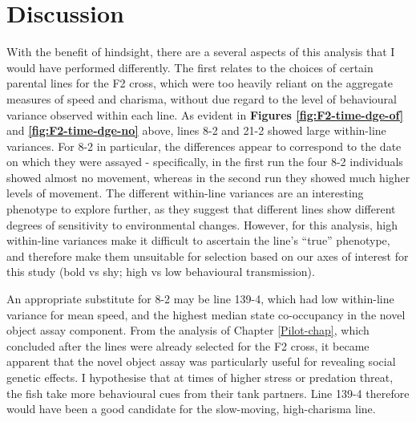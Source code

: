 \documentclass[
]{book}
\begin{document}
\hypertarget{discussion-1}{%
\section{Discussion}\label{discussion-1}}

With the benefit of hindsight, there are a several aspects of this analysis that I would have performed differently. The first relates to the choices of certain parental lines for the F2 cross, which were too heavily reliant on the aggregate measures of speed and charisma, without due regard to the level of behavioural variance observed within each line. As evident in \textbf{Figures \ref{fig:F2-time-dge-of}} and \textbf{\ref{fig:F2-time-dge-no}} above, lines \textcolor{8-2_FF699C}{8-2} and \textcolor{21-2_49B500}{21-2} showed large within-line variances. For \textcolor{8-2_FF699C}{8-2} in particular, the differences appear to correspond to the date on which they were assayed - specifically, in the first run the four \textcolor{8-2_FF699C}{8-2} individuals showed almost no movement, whereas in the second run they showed much higher levels of movement. The different within-line variances are an interesting phenotype to explore further, as they suggest that different lines show different degrees of sensitivity to environmental changes. However, for this analysis, high within-line variances make it difficult to ascertain the line's ``true'' phenotype, and therefore make them unsuitable for selection based on our axes of interest for this study (bold vs shy; high vs low behavioural transmission).

An appropriate substitute for \textcolor{8-2_FF699C}{8-2} may be line \textcolor{139-4_FF61CC}{139-4}, which had low within-line variance for mean speed, and the highest median state co-occupancy in the novel object assay component. From the analysis of Chapter \ref{Pilot-chap}, which concluded after the lines were already selected for the F2 cross, it became apparent that the novel object assay was particularly useful for revealing social genetic effects. I hypothesise that at times of higher stress or predation threat, the fish take more behavioural cues from their tank partners. Line \textcolor{139-4_FF61CC}{139-4} therefore would have been a good candidate for the slow-moving, high-charisma line.
\end{document}
